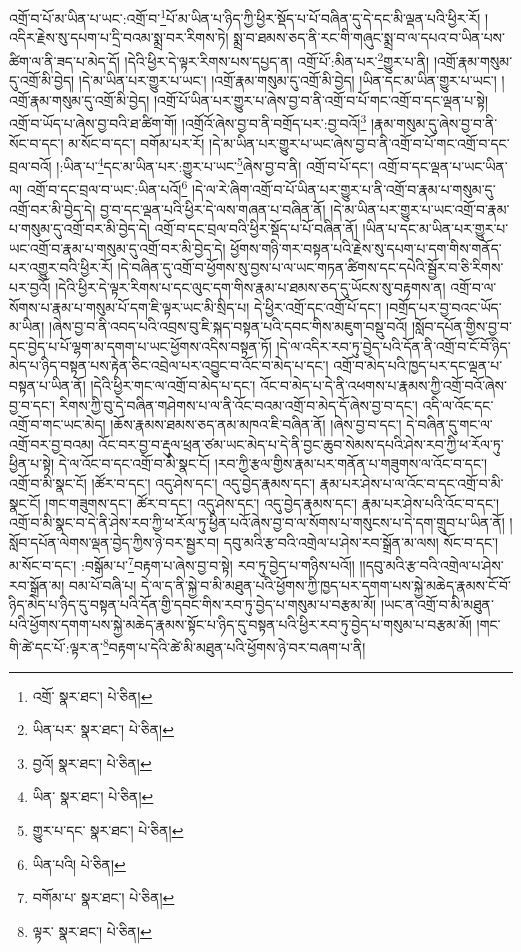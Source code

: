 འགྲོ་བ་པོ་མ་ཡིན་པ་ཡང་:འགྲོ་བ་\footnote{འགྲོ་  སྣར་ཐང་།  པེ་ཅིན། }པོ་མ་ཡིན་པ་ཉིད་ཀྱི་ཕྱིར་སྡོད་པ་པོ་བཞིན་དུ་དེ་དང་མི་ལྡན་པའི་ཕྱིར་རོ། །འདིར་རྗེས་སུ་དཔག་པ་དྲི་བའམ་སྨྲ་བར་རིགས་ཏེ། སྨྲ་བ་ཐམས་ཅད་ནི་རང་གི་གཞུང་སྨྲ་བ་ལ་དཔའ་བ་ཡིན་པས་ཚིག་ལ་ནི་ཟད་པ་མེད་དོ། །དེའི་ཕྱིར་དེ་ལྟར་རིགས་པས་དཔྱད་ན། འགྲོ་པོ་:མིན་པར་\footnote{ཡིན་པར་  སྣར་ཐང་།  པེ་ཅིན། }གྱུར་པ་ནི། །འགྲོ་རྣམ་གསུམ་དུ་འགྲོ་མི་བྱེད། །དེ་མ་ཡིན་པར་གྱུར་པ་ཡང་། །འགྲོ་རྣམ་གསུམ་དུ་འགྲོ་མི་བྱེད། །ཡིན་དང་མ་ཡིན་གྱུར་པ་ཡང་། །འགྲོ་རྣམ་གསུམ་དུ་འགྲོ་མི་བྱེད། །འགྲོ་པོ་ཡིན་པར་གྱུར་པ་ཞེས་བྱ་བ་ནི་འགྲོ་བ་པོ་གང་འགྲོ་བ་དང་ལྡན་པ་སྟེ། འགྲོ་བ་ཡོད་པ་ཞེས་བྱ་བའི་ཐ་ཚིག་གོ། །འགྲོའོ་ཞེས་བྱ་བ་ནི་བགྲོད་པར་:བྱ་བའོ།\footnote{བྱའོ།  སྣར་ཐང་།  པེ་ཅིན། } །རྣམ་གསུམ་དུ་ཞེས་བྱ་བ་ནི་སོང་བ་དང་། མ་སོང་བ་དང་། བགོམ་པར་རོ། །དེ་མ་ཡིན་པར་གྱུར་པ་ཡང་ཞེས་བྱ་བ་ནི་འགྲོ་བ་པོ་གང་འགྲོ་བ་དང་བྲལ་བའོ། །:ཡིན་པ་\footnote{ཡིན་  སྣར་ཐང་།  པེ་ཅིན། }དང་མ་ཡིན་པར་:གྱུར་པ་ཡང་\footnote{གྱུར་པ་དང་  སྣར་ཐང་།  པེ་ཅིན། }ཞེས་བྱ་བ་ནི། འགྲོ་བ་པོ་དང་། འགྲོ་བ་དང་ལྡན་པ་ཡང་ཡིན་ལ། འགྲོ་བ་དང་བྲལ་བ་ཡང་:ཡིན་པའོ།\footnote{ཡིན་པའི།  པེ་ཅིན། } །དེ་ལ་རེ་ཞིག་འགྲོ་བ་པོ་ཡིན་པར་གྱུར་པ་ནི་འགྲོ་བ་རྣམ་པ་གསུམ་དུ་འགྲོ་བར་མི་བྱེད་དེ། བྱ་བ་དང་ལྡན་པའི་ཕྱིར་དེ་ལས་གཞན་པ་བཞིན་ནོ། །དེ་མ་ཡིན་པར་གྱུར་པ་ཡང་འགྲོ་བ་རྣམ་པ་གསུམ་དུ་འགྲོ་བར་མི་བྱེད་དེ། འགྲོ་བ་དང་བྲལ་བའི་ཕྱིར་སྡོད་པ་པོ་བཞིན་ནོ། །ཡིན་པ་དང་མ་ཡིན་པར་གྱུར་པ་ཡང་འགྲོ་བ་རྣམ་པ་གསུམ་དུ་འགྲོ་བར་མི་བྱེད་དེ། ཕྱོགས་གཉི་གར་བསྟན་པའི་རྗེས་སུ་དཔག་པ་དག་གིས་གནོད་པར་འགྱུར་བའི་ཕྱིར་རོ། །དེ་བཞིན་དུ་འགྲོ་བ་ཕྱོགས་སུ་བྱས་པ་ལ་ཡང་གཏན་ཚིགས་དང་དཔེའི་སྦྱོར་བ་ཅི་རིགས་པར་བྱའོ། །དེའི་ཕྱིར་དེ་ལྟར་རིགས་པ་དང་ལུང་དག་གིས་རྣམ་པ་ཐམས་ཅད་དུ་ཡོངས་སུ་བརྟགས་ན། འགྲོ་བ་ལ་སོགས་པ་རྣམ་པ་གསུམ་པོ་དག་ཇི་ལྟར་ཡང་མི་སྲིད་པ། དེ་ཕྱིར་འགྲོ་དང་འགྲོ་པོ་དང་། །བགྲོད་པར་བྱ་བའང་ཡོད་མ་ཡིན། །ཞེས་བྱ་བ་ནི་འབད་པའི་འབྲས་བུ་ཇི་སྐད་བསྟན་པའི་དབང་གིས་མཇུག་བསྡུ་བའོ། །སློབ་དཔོན་གྱིས་བྱ་བ་དང་བྱེད་པ་པོ་ལྷག་མ་དགག་པ་ཡང་ཕྱོགས་འདིས་བསྟན་ཏོ། །དེ་ལ་འདིར་རབ་ཏུ་བྱེད་པའི་དོན་ནི་འགྲོ་བ་ངོ་བོ་ཉིད་མེད་པ་ཉིད་བསྟན་པས་རྟེན་ཅིང་འབྲེལ་པར་འབྱུང་བ་འོང་བ་མེད་པ་དང་། འགྲོ་བ་མེད་པའི་ཁྱད་པར་དང་ལྡན་པ་བསྟན་པ་ཡིན་ནོ། །དེའི་ཕྱིར་གང་ལ་འགྲོ་བ་མེད་པ་དང་། འོང་བ་མེད་པ་དེ་ནི་འཕགས་པ་རྣམས་ཀྱི་འགྲོ་བའོ་ཞེས་བྱ་བ་དང་། རིགས་ཀྱི་བུ་དེ་བཞིན་གཤེགས་པ་ལ་ནི་འོང་བའམ་འགྲོ་བ་མེད་དོ་ཞེས་བྱ་བ་དང་། འདི་ལ་འོང་དང་འགྲོ་བ་གང་ཡང་མེད། །ཆོས་རྣམས་ཐམས་ཅད་ནམ་མཁའ་ཇི་བཞིན་ནོ། །ཞེས་བྱ་བ་དང་། དེ་བཞིན་དུ་གང་ལ་འགྲོ་བར་བྱ་བའམ། འོང་བར་བྱ་བ་རྡུལ་ཕྲན་ཙམ་ཡང་མེད་པ་དེ་ནི་བྱང་ཆུབ་སེམས་དཔའི་ཤེས་རབ་ཀྱི་ཕ་རོལ་ཏུ་ཕྱིན་པ་སྟེ། དེ་ལ་འོང་བ་དང་འགྲོ་བ་མི་སྣང་ངོ། །རབ་ཀྱི་རྩལ་གྱིས་རྣམ་པར་གནོན་པ་གཟུགས་ལ་འོང་བ་དང་། འགྲོ་བ་མི་སྣང་ངོ། །ཚོར་བ་དང་། འདུ་ཤེས་དང་། འདུ་བྱེད་རྣམས་དང་། རྣམ་པར་ཤེས་པ་ལ་འོང་བ་དང་འགྲོ་བ་མི་སྣང་ངོ། །གང་གཟུགས་དང་། ཚོར་བ་དང་། འདུ་ཤེས་དང་། འདུ་བྱེད་རྣམས་དང་། རྣམ་པར་ཤེས་པའི་འོང་བ་དང་། འགྲོ་བ་མི་སྣང་བ་དེ་ནི་ཤེས་རབ་ཀྱི་ཕ་རོལ་ཏུ་ཕྱིན་པའོ་ཞེས་བྱ་བ་ལ་སོགས་པ་གསུངས་པ་དེ་དག་གྲུབ་པ་ཡིན་ནོ། །སློབ་དཔོན་ལེགས་ལྡན་བྱེད་ཀྱིས་ཉེ་བར་སྦྱར་བ། དབུ་མའི་རྩ་བའི་འགྲེལ་པ་ཤེས་རབ་སྒྲོན་མ་ལས། སོང་བ་དང་། མ་སོང་བ་དང་། :བསྒོམ་པ་\footnote{བགོམ་པ་  སྣར་ཐང་།  པེ་ཅིན། }བརྟག་པ་ཞེས་བྱ་བ་སྟེ། རབ་ཏུ་བྱེད་པ་གཉིས་པའོ།། །།དབུ་མའི་རྩ་བའི་འགྲེལ་པ་ཤེས་རབ་སྒྲོན་མ། བམ་པོ་བཞི་པ། དེ་ལ་ད་ནི་སྐྱེ་བ་མི་མཐུན་པའི་ཕྱོགས་ཀྱི་ཁྱད་པར་དགག་པས་སྐྱེ་མཆེད་རྣམས་ངོ་བོ་ཉིད་མེད་པ་ཉིད་དུ་བསྟན་པའི་དོན་གྱི་དབང་གིས་རབ་ཏུ་བྱེད་པ་གསུམ་པ་བརྩམ་མོ། །ཡང་ན་འགྲོ་བ་མི་མཐུན་པའི་ཕྱོགས་དགག་པས་སྐྱེ་མཆེད་རྣམས་སྟོང་པ་ཉིད་དུ་བསྟན་པའི་ཕྱིར་རབ་ཏུ་བྱེད་པ་གསུམ་པ་བརྩམ་མོ། །གང་གི་ཚེ་དང་པོ་:ལྟར་ན་\footnote{ལྟར་  སྣར་ཐང་།  པེ་ཅིན། }བརྟག་པ་དེའི་ཚེ་མི་མཐུན་པའི་ཕྱོགས་ཉེ་བར་བཞག་པ་ནི། 
